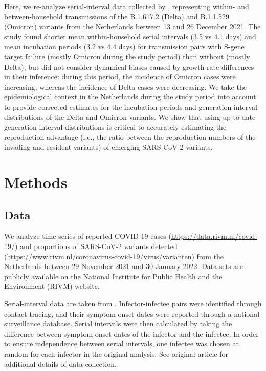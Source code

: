 \documentclass[12pt]{article}
\begin{document}
Here, we re-analyze serial-interval data collected by \citep{backer2021omicron}, representing within- and between-household transmissions of the B.1.617.2 (Delta) and B.1.1.529 (Omicron) variants from the Netherlands between 13 and 26 December 2021.
The study found shorter mean within-household serial intervals (3.5 vs 4.1 days) and mean incubation periods (3.2 vs 4.4 days) for transmission pairs with S-gene target failure (mostly Omicron during the study period) than without (mostly Delta), but did not consider dynamical biases caused by growth-rate differences in their inference:
during this period, the incidence of Omicron cases were increasing, whereas the incidence of Delta cases were decreasing.
We take the epidemiological context in the Netherlands during the study period into account to provide corrected estimates for the incubation periods and generation-interval distributions of the Delta and Omicron variants.
We show that using up-to-date generation-interval distributions is critical to accurately estimating the reproduction advantage (i.e., the ratio between the reproduction numbers of the invading and resident variants) of emerging SARS-CoV-2 variants.

\section{Methods}

\subsection{Data}

We analyze time series of reported COVID-19 cases (\url{https://data.rivm.nl/covid-19/}) and proportions of SARS-CoV-2 variants detected (\url{https://www.rivm.nl/coronavirus-covid-19/virus/varianten}) from the Netherlands between 29 November 2021 and 30 January 2022.
Data sets are publicly available on the National Institute for Public Health and the Environment (RIVM) website.

Serial-interval data are taken from \cite{backer2021omicron}.
Infector-infectee pairs were identified through contact tracing, and their symptom onset dates were reported through a national surveillance database.
Serial intervals were then calculated by taking the difference between symptom onset dates of the infector and the infectee.
In order to ensure independence between serial intervals, one infectee was chosen at random for each infector in the original analysis.
See original article for additional details of data collection.
\end{document}
